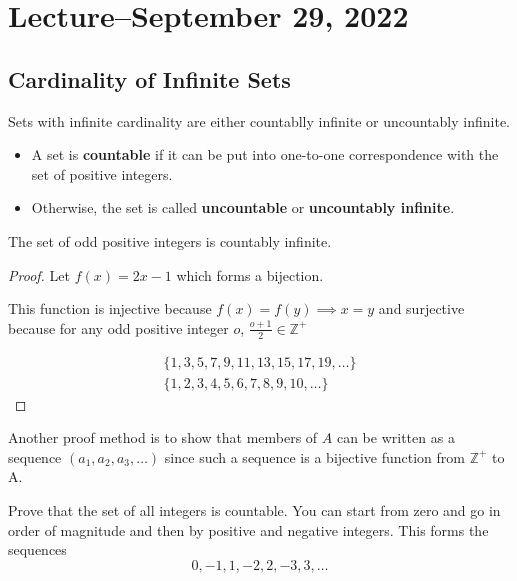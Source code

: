 \documentclass{scrreprt}
\begin{document}
\section{Lecture--September 29, 2022}

\subsection{Cardinality of Infinite Sets}

Sets with infinite cardinality are either countablly infinite or uncountably infinite.

\begin{itemize}
	\item A set is \textbf{countable} if it can be put into one-to-one correspondence with the set of positive integers.
	\item Otherwise, the set is called \textbf{uncountable} or \textbf{uncountably infinite}.
\end{itemize}

\begin{example}
	The set of odd positive integers is countably infinite.

	\begin{proof}
		Let $f(x)=2x-1$ which forms a bijection.

		This function is injective because $f(x)=f(y)\implies x=y$ and surjective
		because for any odd positive integer $o$, $\frac{o+1}{2}\in \mathbb{Z}^+$

		\begin{align*}
			\{1, 3, 5, 7, 9, 11, 13, 15, 17, 19, \ldots\} \\
			\{1, 2, 3, 4, 5, 6, 7, 8, 9, 10, \ldots\}
		\end{align*}
	\end{proof}
\end{example}

Another proof method is to show that members of $A$ can be written as a sequence
$(a_1, a_2, a_3, \ldots)$ since such a sequence is a bijective function from $\mathbb{Z}^+$ to A.

\begin{example}
	Prove that the set of all integers is countable. You can start from zero and go in order of
	magnitude and then by positive and negative integers. This forms the sequences
	\[0,-1,1,-2,2,-3,3,\ldots\]
\end{example}
\end{document}
